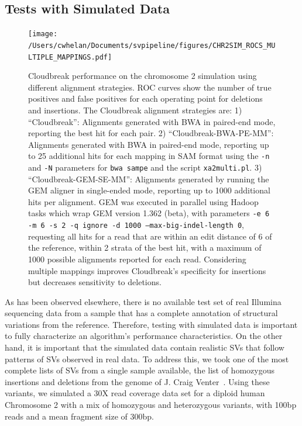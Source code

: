 \subsection{Tests with Simulated Data}

\begin{figure}
\centering
\texttt{[image: /Users/cwhelan/Documents/svpipeline/figures/CHR2SIM\_ROCS\_MULTIPLE\_MAPPINGS.pdf]}
\caption{Cloudbreak performance on the chromosome 2 simulation using different alignment strategies. ROC curves show the number of true positives and false positives for each operating point for deletions and insertions. The Cloudbreak alignment strategies are: 1) ``Cloudbreak'': Alignments generated with BWA in paired-end mode, reporting the best hit for each pair. 2) ``Cloudbreak-BWA-PE-MM'': Alignments generated with BWA in paired-end mode, reporting up to 25 additional hits for each mapping in SAM format using the \texttt{-n} and \texttt{-N} parameters for \texttt{bwa sampe} and the script \texttt{xa2multi.pl}. 3) ``Cloudbreak-GEM-SE-MM'': Alignments generated by running the GEM aligner in single-ended mode, reporting up to 1000 additional hits per alignment. GEM was executed in parallel using Hadoop tasks which wrap GEM version 1.362 (beta), with parameters \texttt{-e 6 -m 6 -s 2 -q ignore -d 1000 --max-big-indel-length 0},  requesting all hits for a read that are within an edit distance of 6 of the reference, within 2 strata of the best hit, with a maximum of 1000 possible alignments reported for each read. Considering multiple mappings improves Cloudbreak's specificity for insertions but decreases sensitivity to deletions.}
\label{alignment_comparison}
\end{figure}


As has been observed elsewhere, there is no available test set of real Illumina sequencing data from a sample that has a complete annotation of structural variations from the reference. Therefore, testing with simulated data is important to fully characterize an algorithm's performance characteristics. On the other hand, it is important that the simulated data contain realistic SVs that follow patterns of SVs observed in real data. To address this, we took one of the most complete lists of SVs from a single sample available, the list of homozygous insertions and deletions from the genome of J. Craig Venter~\cite{Levy:2007fb}. Using these variants, we simulated a 30X read coverage data set for a diploid human Chromosome 2 with a mix of homozygous and heterozygous variants, with 100bp reads and a mean fragment size of 300bp.

